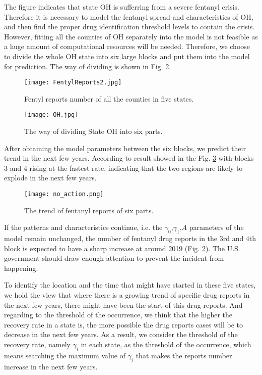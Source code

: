 The figure indicates that state OH is sufferring from a severe fentanyl crisis. Therefore it is necessary to model the fentanyl spread and characteristics of OH, and then find the proper drug identification threshold levels to contain the crisis. However, fitting all the counties of OH separately into the model is not feasible as a huge amount of computational resources will be needed. Therefore, we choose to divide the whole OH state into six large blocks and put them into the model for prediction. The way of dividing is shown in Fig. \ref{OH_DIVIDE}.
\begin{figure}
	\centering
	\texttt{[image: FentylReports2.jpg]}
	\caption{Fentyl reports number of all the counties in five states.}
	\label{FentylReports2}
\end{figure}
\begin{figure}
	\centering
	\texttt{[image: OH.jpg]}
	\caption{The way of dividing State OH into six parts.}
	\label{OH_DIVIDE}
\end{figure}

After obtaining the model parameters between the six blocks, we predict their trend in the next few years. According to result showed in the Fig. \ref{no_action} with blocks 3 and 4 rising at the fastest rate, indicating that the two regions are likely to explode in the next few years.
\begin{figure}
	\centering
	\texttt{[image: no\_action.png]}
	\caption{The trend of fentanyl reports of six parts.}
	\label{no_action}
\end{figure}

If the patterns and characteristics continue, i.e. the $\gamma_0$,$\gamma_1$,$A$ parameters of the model remain unchanged, the number of fentanyl drug reports in the 3rd and 4th block is expected to have a sharp increase at around 2019 (Fig. \ref{OH_DIVIDE}). The U.S. government should draw enough attention to prevent the incident from happening.

To identify the location and the time that might have started in these five states, we hold the view that where there is a growing trend of specific drug reports in the next few years, there might have been the start of this drug reports. And regarding to the threshold of the occurrence, we think that the higher the recovery rate in a state is, the more possible the drug reports cases will be to decrease in the next few years. As a result, we consider the threshold of the recovery rate, namely $\gamma_i$ in each state, as the threshold of the occurrence, which means searching the maximum value of $\gamma_i$ that makes the reports number increase in the next few years.

